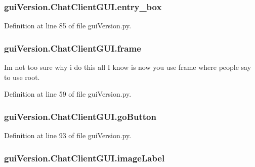 \subsubsection[{entry\+\_\+box}]{\setlength{\rightskip}{0pt plus 5cm}gui\+Version.\+Chat\+Client\+G\+U\+I.\+entry\+\_\+box}\label{classgui_version_1_1_chat_client_g_u_i_a4436c621e5f3c806218c2756edf488f7}


Definition at line 85 of file gui\+Version.\+py.

\hypertarget{classgui_version_1_1_chat_client_g_u_i_a7809572437bc7888072cb612990da273}{}
\subsubsection[{frame}]{\setlength{\rightskip}{0pt plus 5cm}gui\+Version.\+Chat\+Client\+G\+U\+I.\+frame}\label{classgui_version_1_1_chat_client_g_u_i_a7809572437bc7888072cb612990da273}


Im not too sure why i do this all I know is now you use frame where people say to use root. 



Definition at line 59 of file gui\+Version.\+py.

\hypertarget{classgui_version_1_1_chat_client_g_u_i_a5a09ecaf8a2c39309f7b7acdea272bc5}{}
\subsubsection[{go\+Button}]{\setlength{\rightskip}{0pt plus 5cm}gui\+Version.\+Chat\+Client\+G\+U\+I.\+go\+Button}\label{classgui_version_1_1_chat_client_g_u_i_a5a09ecaf8a2c39309f7b7acdea272bc5}


Definition at line 93 of file gui\+Version.\+py.

\hypertarget{classgui_version_1_1_chat_client_g_u_i_adc513d1ee47a0582c35cc426cd582f1d}{}
\subsubsection[{image\+Label}]{\setlength{\rightskip}{0pt plus 5cm}gui\+Version.\+Chat\+Client\+G\+U\+I.\+image\+Label}\label{classgui_version_1_1_chat_client_g_u_i_adc513d1ee47a0582c35cc426cd582f1d}


